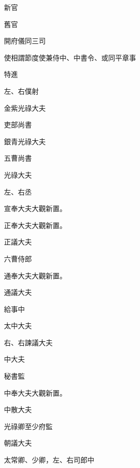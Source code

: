 \begin{pinyinscope}
 新官



 舊官



 開府儀同三司



 使相謂節度使兼侍中、中書令、或同平章事



 特進



 左、右僕射



 金紫光祿大夫



 吏部尚書



 銀青光祿大夫



 五曹尚書



 光祿大夫



 左、右丞



 宣奉大夫大觀新置。



 正奉大夫大觀新置。



 正議大夫



 六曹侍郎



 通奉大夫大觀新置。



 通議大夫



 給事中



 太中大夫



 右、右諫議大夫



 中大夫



 秘書監



 中奉大夫大觀新置。



 中散大夫



 光祿卿至少府監



 朝議大夫



 太常卿、少卿，左、右司郎中




\end{pinyinscope}
